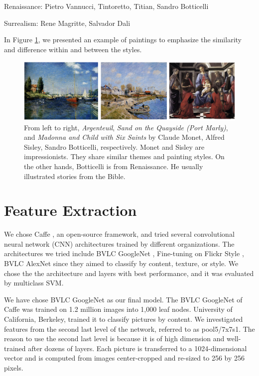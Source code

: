 \documentclass[11pt,a4paper]{article}
\begin{document}
\noindent 
{\small Renaissance: Pietro Vannucci, Tintoretto, Titian, Sandro Botticelli }

\noindent 
{\small Surrealism: Rene Magritte, Salvador Dali}
\vspace{0.1in}

In Figure \ref{images}, we presented an example of paintings to emphasize the similarity and difference within and between the styles.
\begin{figure}
    \centering
    \includegraphics[width = 5in]{images}
    \caption{From left to right, \textit{Argenteuil}, \textit{Sand on the Quayside (Port Marly)}, and \textit{Madonna and Child with Six Saints} by Claude Monet, Alfred Sisley, Sandro Botticelli, respectively. Monet and Sisley are impressionists. They share similar themes and painting styles. On the other hands, Botticelli is from Renaissance. He usually illustrated stories from the Bible.}
    \label{images}
\end{figure}

\section{Feature Extraction}
We chose Caffe \cite{DBLP:journals/corr/DonahueJVHZTD13}, an open-source framework, and tried several convolutional neural network (CNN) architectures trained by different organizations. The architectures we tried include BVLC GoogleNet \cite{DBLP:journals/corr/DonahueJVHZTD13},  Fine-tuning on Flickr Style \cite{karayev2013recognizing}, BVLC AlexNet \cite{krizhevsky2012imagenet} since they aimed to classify by content, texture, or style. We chose the the architecture and layers with best performance, and it was evaluated by multiclass SVM.

We have chose BVLC GoogleNet as our final model. The BVLC GoogleNet of Caffe was trained on 1.2 million images into 1,000 leaf nodes. University of California, Berkeley, trained it to classify pictures by content. We investigated features from the second last level of the network, referred to as pool5/7x7s1. The reason to use the second last level is because it is of high dimension and well-trained after dozens of layers. Each picture is transferred to a 1024-dimensional vector and is computed from images center-cropped and re-sized to 256 by 256 pixels.
\end{document}
